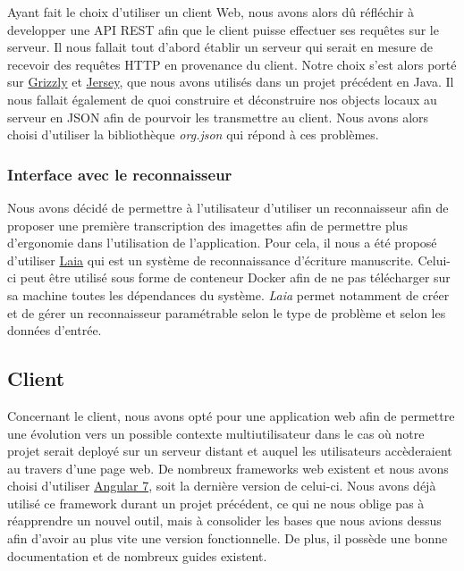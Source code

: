 Ayant fait le choix d'utiliser un client Web, nous avons alors dû réfléchir à developper une API REST afin que le client puisse effectuer ses requêtes sur le serveur. Il nous fallait tout d'abord établir un serveur qui serait en mesure de recevoir des requêtes HTTP en provenance du client. Notre choix s'est alors porté sur \href{https://javaee.github.io/grizzly}{Grizzly} et \href{https://jersey.github.io}{Jersey}, que nous avons utilisés dans un projet précédent en Java. Il nous fallait également de quoi construire et déconstruire nos objects locaux au serveur en JSON afin de pourvoir les transmettre au client. Nous avons alors choisi d'utiliser la bibliothèque \textit{org.json} qui répond à ces problèmes.

\subsubsection{Interface avec le reconnaisseur}

Nous avons décidé de permettre à l'utilisateur d'utiliser un reconnaisseur afin de proposer une première transcription des imagettes afin de permettre plus d'ergonomie dans l'utilisation de l'application. Pour cela, il nous a été proposé d'utiliser \href{https://github.com/jpuigcerver/Laia}{Laia} qui est un système de reconnaissance d'écriture manuscrite. Celui-ci peut être utilisé sous forme de conteneur Docker afin de ne pas télécharger sur sa machine toutes les dépendances du système. \textit{Laia} permet notamment de créer et de gérer un reconnaisseur paramétrable selon le type de problème et selon les données d'entrée.

\subsection{Client}

Concernant le client, nous avons opté pour une application web afin de permettre une évolution vers un possible contexte multiutilisateur dans le cas où notre projet serait deployé sur un serveur distant et auquel les utilisateurs accèderaient au travers d'une page web. De nombreux frameworks web existent et nous avons choisi d'utiliser \href{https://angular.io}{Angular 7}, soit la dernière version de celui-ci. Nous avons déjà utilisé ce framework durant un projet précédent, ce qui ne nous oblige pas à réapprendre un nouvel outil, mais à consolider les bases que nous avions dessus afin d'avoir au plus vite une version fonctionnelle. De plus, il possède une bonne documentation et de nombreux guides existent.
